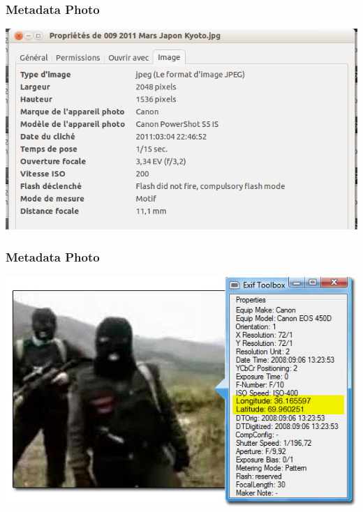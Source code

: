 \documentclass{beamer}
\begin{document}
%
\begin{frame}
\frametitle{Metadata Photo}
\begin{center}
\includegraphics[scale=0.5] {./images/Metadata.png} 
\end{center}
\end{frame}

\begin{frame}
\frametitle{Metadata Photo}
\begin{center}
\includegraphics[scale=0.5] {./images/exif-metadata.jpg} 
\end{center}
\end{frame}
\end{document}
